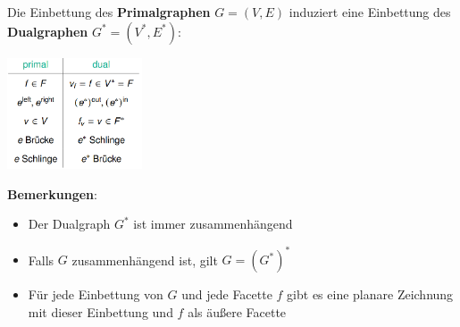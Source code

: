 Die Einbettung des \textbf{Primalgraphen} $G = (V, E)$ induziert eine Einbettung des \textbf{Dualgraphen} $G^* = (V^*, E^*)$:
\begin{center}
	\includegraphics[width=0.3\textwidth]{images/primal-dual.png}
\end{center}
\bigskip
\textbf{Bemerkungen}: 
\begin{itemize}
	\item Der Dualgraph $G^*$ ist immer zusammenhängend
	\item Falls $G$ zusammenhängend ist, gilt $G = (G^*)^*$
	\item Für jede Einbettung von $G$ und jede Facette $f$ gibt es eine planare Zeichnung mit dieser Einbettung und $f$ als äußere Facette
\end{itemize}